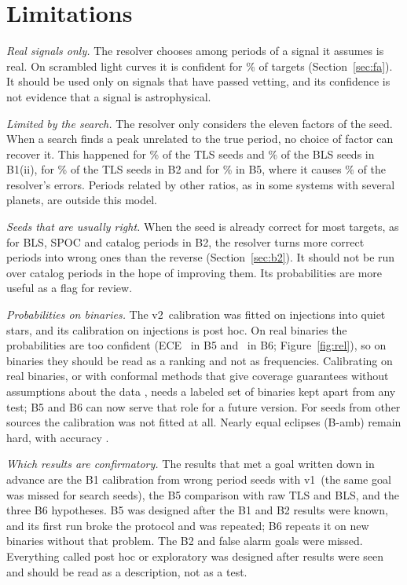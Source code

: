 \documentclass[twocolumn,linenumbers]{aastex701}
\newcommand{\Vone}{v1}
\newcommand{\Vtwo}{v2}
\begin{document}


\section{Limitations} \label{sec:limits}

\emph{Real signals only.} The resolver chooses among periods of a signal it assumes is real. On scrambled light curves it is confident for \faScrVtwo\% of targets (Section~\ref{sec:fa}). It should be used only on signals that have passed vetting, and its confidence is not evidence that a signal is astrophysical.

\emph{Limited by the search.} The resolver only considers the eleven factors of the seed. When a search finds a peak unrelated to the true period, no choice of factor can recover it. This happened for \bOneTMissPc\% of the TLS seeds and \bOneBMissPc\% of the BLS seeds in B1(ii), for \bTwoMissTlsPc\% of the TLS seeds in B2 and for \bFiveMissTlsPc\% in B5, where it causes \bFiveErrNoCandPc\% of the resolver's errors. Periods related by other ratios, as in some systems with several planets, are outside this model.

\emph{Seeds that are usually right.} When the seed is already correct for most targets, as for BLS, SPOC and catalog periods in B2, the resolver turns more correct periods into wrong ones than the reverse (Section~\ref{sec:b2}). It should not be run over catalog periods in the hope of improving them. Its probabilities are more useful as a flag for review.

\emph{Probabilities on binaries.} The \Vtwo\ calibration was fitted on injections into quiet stars, and its calibration on injections is post hoc. On real binaries the probabilities are too confident (ECE \bFiveEce\ in B5 and \bSixEce\ in B6; Figure~\ref{fig:rel}), so on binaries they should be read as a ranking and not as frequencies. Calibrating on real binaries, or with conformal methods that give coverage guarantees without assumptions about the data \citep{Angelopoulos2021}, needs a labeled set of binaries kept apart from any test; B5 and B6 can now serve that role for a future version. For seeds from other sources the calibration was not fitted at all. Nearly equal eclipses (B-amb) remain hard, with accuracy \bFiveAmbAcc.

\emph{Which results are confirmatory.} The results that met a goal written down in advance are the B1 calibration from wrong period seeds with \Vone\ (the same goal was missed for search seeds), the B5 comparison with raw TLS and BLS, and the three B6 hypotheses. B5 was designed after the B1 and B2 results were known, and its first run broke the protocol and was repeated; B6 repeats it on new binaries without that problem. The B2 and false alarm goals were missed. Everything called post hoc or exploratory was designed after results were seen and should be read as a description, not as a test.
\end{document}
